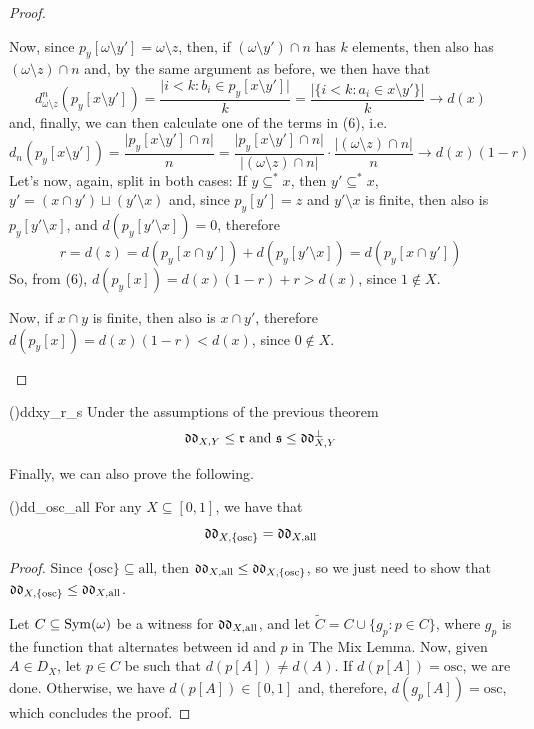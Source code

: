 \begin{proof}
\begin{itemize}
        Now, since $p_y[\omega\setminus y']=\omega\setminus z$, then, if $(\omega\setminus y')\cap n$ has $k$ elements, then also has $(\omega\setminus z)\cap n$ and, by the same argument as before, we then have that
        $$d_{\omega\setminus z}^n(p_y[x\setminus y'])=\frac{\lvert i<k:b_i\in p_y[x\setminus y']\rvert}{k}=\frac{\lvert\{i<k:a_i\in x\setminus y'\}\rvert}{k}\to d(x)$$
        and, finally, we can then calculate one of the terms in (6), i.e.
        $$d_n(p_y[x\setminus y'])=\frac{\lvert p_y[x\setminus y']\cap n\rvert}{n}=\frac{\lvert p_y[x\setminus y']\cap n\rvert}{\lvert(\omega\setminus z)\cap n\rvert}\cdot\frac{\lvert(\omega\setminus z)\cap n\rvert}{n}\to d(x)(1-r)$$
        Let's now, again, split in both cases: If $y\subseteq^* x$, then $y'\subseteq^*x$, $y'=(x\cap y')\sqcup(y'\setminus x)$ and, since $p_y[y']=z$ and $y'\setminus x$ is finite, then also is $p_y[y'\setminus x]$, and $d(p_y[y'\setminus x])=0$, therefore
        $$r=d(z)=d(p_y[x\cap y'])+d(p_y[y'\setminus x])=d(p_y[x\cap y'])$$
        So, from (6), $d(p_y[x])=d(x)(1-r)+r>d(x)$, since $1\notin X$.

        Now, if $x\cap y$ is finite, then also is $x\cap y'$, therefore $d(p_y[x])=d(x)(1-r)<d(x)$, since $0\notin X$.
    \end{itemize}
\end{proof}

\begin{corollary}{(\cite{brech})}{ddxy_r_s}
    Under the assumptions of the previous theorem
    $$\mathfrak{dd}_{X,Y}\leq\mathfrak{r}\text{ and }\mathfrak{s}\leq\mathfrak{dd}_{X,Y}^\bot$$
\end{corollary}

Finally, we can also prove the following.

\begin{theorem}{(\cite{brech})}{dd_osc_all}
    For any $X\subseteq[0,1]$, we have that
    $$\mathfrak{dd}_{X,\{\text{osc}\}}=\mathfrak{dd}_{X,\text{all}}$$
\end{theorem}

\begin{proof}
    Since $\{\text{osc}\}\subseteq\text{all}$, then $\mathfrak{dd}_{X,\text{all}}\leq\mathfrak{dd}_{X,\{\text{osc}\}}$, so we just need to show that $\mathfrak{dd}_{X,\{\text{osc}\}}\leq\mathfrak{dd}_{X,\text{all}}$.

    Let $C\subseteq\mathrm{Sym}(\omega)$ be a witness for $\mathfrak{dd}_{X,\text{all}}$, and let $\widetilde{C}=C\cup\{g_p:p\in C\}$, where $g_p$ is the function that alternates between $\text{id}$ and $p$ in The Mix Lemma. Now, given $A\in D_X$, let $p\in C$ be such that $d(p[A])\neq d(A)$. If $d(p[A])=\text{osc}$, we are done. Otherwise, we have $d(p[A])\in[0,1]$ and, therefore, $d(g_p[A])=\text{osc}$, which concludes the proof.
\end{proof}